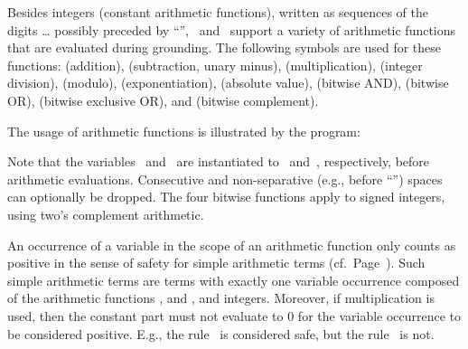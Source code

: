 Besides integers (constant arithmetic functions),
written as sequences of the digits \dots{}
possibly preceded by ``\code{-}'',
\gringo\ and \clingo\ support a variety of arithmetic functions that
are evaluated during grounding.
The following symbols are used for these functions:
\code{+} (addition),
\code{-} (subtraction, unary minus),
\code{*} (multiplication),
\code{/} (integer division),
\code{\textbackslash} (modulo),
\code{**} (exponentiation),
\code{|$\cdot$|} (absolute value),
\code{\&} (bitwise AND),
 (bitwise OR),
\code{\^} (bitwise exclusive OR), and
\code{\textasciitilde} (bitwise complement).

\begin{example}\label{ex:arith:fun}
The usage of arithmetic functions is illustrated by the program:%
%

%
Note that the variables~ and~ are instantiated to~ and~,
respectively, before arithmetic evaluations.
Consecutive and non-separative (e.g., before ``\code{(}'')
spaces can optionally be dropped.
The four bitwise functions apply to signed integers,
using two's complement arithmetic. %
\eexample
\end{example}

\begin{note}
An occurrence of a variable in the scope of an arithmetic function
only counts as positive in the sense of safety for simple arithmetic terms (cf.\ Page~\pageref{pg:safe}).
Such simple arithmetic terms are terms with exactly one variable occurrence
composed of the arithmetic functions \code{+}, \code{-} and \code{*}, and integers.
Moreover,
if multiplication is used, then the constant part must not evaluate to $0$ for the variable occurrence to be considered positive.
E.g., the rule~
is considered safe, but
the rule~ is not.
%
\end{note}

